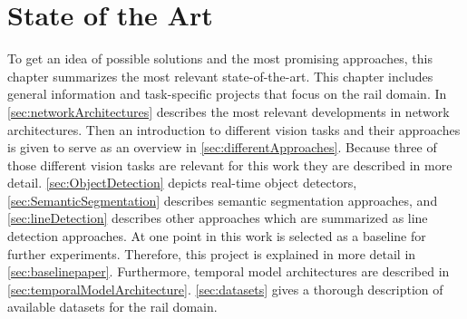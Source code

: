 \chapter{State of the Art}
\label{sec:stateOfTheArt}

To get an idea of possible solutions and the most promising approaches, this chapter summarizes the most relevant state-of-the-art.
This chapter includes general information and task-specific projects that focus on the rail domain.
In \autoref{sec:networkArchitectures} describes the most relevant developments in network architectures.
Then an introduction to different vision tasks and their approaches is given to serve as an overview in \autoref{sec:differentApproaches}.
Because three of those different vision tasks are relevant for this work they are described in more detail.
\autoref{sec:ObjectDetection} depicts real-time object detectors, \autoref{sec:SemanticSegmentation} describes semantic segmentation approaches, and \autoref{sec:lineDetection} describes other approaches which are summarized as line detection approaches.
At one point in this work \cite{tepNet2024} is selected as a baseline for further experiments.
Therefore, this project is explained in more detail in \autoref{sec:baselinepaper}.
Furthermore, temporal model architectures are described in \autoref{sec:temporalModelArchitecture}.
\autoref{sec:datasets} gives a thorough description of available datasets for the rail domain.





\clearpage








\clearpage 


